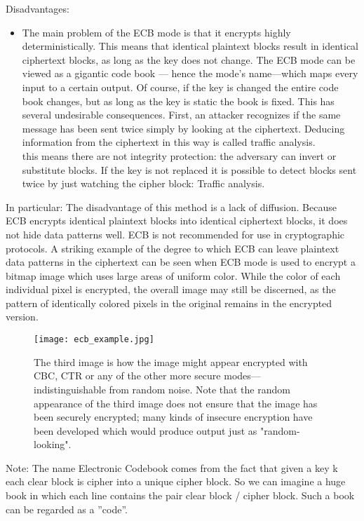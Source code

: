 \documentclass{article}
\begin{document}
Disadvantages:
\begin{itemize}
    \item 
    The
main problem of the ECB mode is that it encrypts highly deterministically. This
means that identical plaintext blocks result in identical ciphertext blocks, as long as
the key does not change. The ECB mode can be viewed as a gigantic code book —
hence the mode’s name—which maps every input to a certain output. Of course, if
the key is changed the entire code book changes, but as long as the key is static the
book is fixed. This has several undesirable consequences. First, an attacker recognizes
if the same message has been sent twice simply by looking at the ciphertext.
Deducing information from the ciphertext in this way is called traffic analysis.\\
this means there are not integrity protection: the adversary can invert or substitute blocks.
If the key is not replaced it is possible to detect blocks sent twice by just watching the
cipher block: Traffic analysis.
\end{itemize}
    In particular: The disadvantage of this method is a lack of diffusion. Because ECB encrypts identical plaintext blocks into identical ciphertext blocks, it does not hide data patterns well. ECB is not recommended for use in cryptographic protocols.
    A striking example of the degree to which ECB can leave plaintext data patterns in the ciphertext can be seen when ECB mode is used to encrypt a bitmap image which uses large areas of uniform color. While the color of each individual pixel is encrypted, the overall image may still be discerned, as the pattern of identically colored pixels in the original remains in the encrypted version.
    
\begin{figure}[H]
    \centering
    \texttt{[image: ecb\_example.jpg]}
    \caption{The third image is how the image might appear encrypted with CBC, CTR or any of the other more secure modes—indistinguishable from random noise. Note that the random appearance of the third image does not ensure that the image has been securely encrypted; many kinds of insecure encryption have been developed which would produce output just as "random-looking".}
\end{figure}

\par\bigskip 
\noindent

Note: The name Electronic Codebook comes from the fact that given a key k each clear block is
cipher into a unique cipher block. So we can imagine a huge book in which each line contains
the pair clear block / cipher block. Such a book can be regarded as a ”code”.
\end{document}
